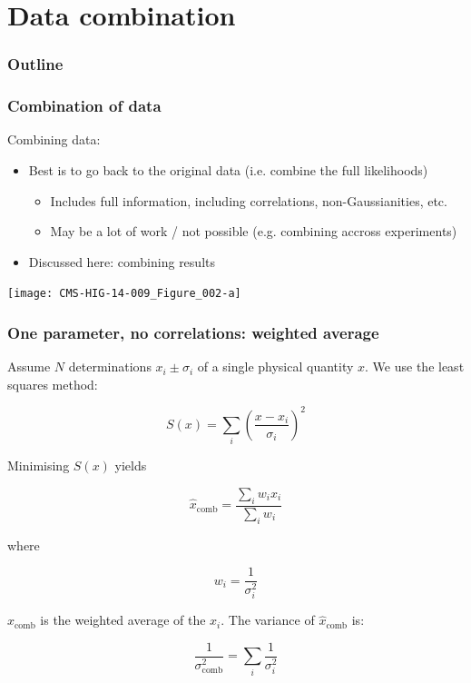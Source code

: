 \documentclass[9pt]{beamer}
\newif\ifmyhide
\newcommand\myhide[1]{%
\ifmyhide \vspace{15pt} \begin{center} \myexample{(blackboard)}\end{center} \vspace{15pt} \else #1 \fi
}
\begin{document}
\section{Data combination}

\begin{frame}
 \frametitle{Outline}
 
 \tableofcontents[current]
\end{frame}


\begin{frame}
 \frametitle{Combination of data}
 
 Combining data:
 
 \begin{itemize}
  \item Best is to go back to the original data (i.e. combine the full likelihoods)
  \begin{itemize}
   \item Includes full information, including correlations, non-Gaussianities, etc.
   \item May be a lot of work / not possible (e.g. combining accross experiments)
  \end{itemize}
  \item<2-> Discussed here: combining results
 \end{itemize}

 \begin{center}
  \texttt{[image: CMS-HIG-14-009\_Figure\_002-a]}\hfill
 \end{center}


\end{frame}

\begin{frame}
 \frametitle{One parameter, no correlations: weighted average}
 
 
 Assume $N$ determinations $x_i \pm \sigma_i$ of a single physical quantity $x$. We use the least squares method:
 
 \myhide{
 $$S(x) = \sum_i \left( \frac{x-x_i}{\sigma_i} \right)^2$$
 
 Minimising $S(x)$ yields 
 
 $$\hat{x}_\text{comb} = \frac{\sum_i w_i  x_i}{\sum_i w_i}$$
 
 where
 
 $$w_i = \frac{1}{\sigma_i^2}$$
 
 $\hat{x}_\text{comb}$ is the weighted average of the $x_i$. The variance of $\hat{x}_\text{comb}$ is:
 
 $$\frac{1}{\sigma^2_\text{comb}} = \sum_i \frac{1}{\sigma_i^2}$$
 }
\end{frame}
\end{document}
